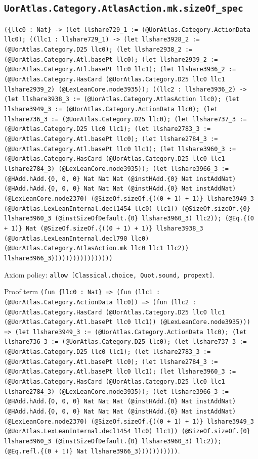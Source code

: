 \documentclass[11pt]{article}
\begin{document}
\subsection*{\texttt{UorAtlas.Category.AtlasAction.mk.sizeOf\_spec}}
\noindent\texttt{(\{llc0 : Nat\} -> (let llshare729\_1 := (@UorAtlas.Category.ActionData llc0); ((llc1 : llshare729\_1) -> (let llshare3928\_2 := (@UorAtlas.Category.D25 llc0); (let llshare2938\_2 := (@UorAtlas.Category.Atl.basePt llc0); (let llshare2939\_2 := (@UorAtlas.Category.Atl.basePt llc0 llc1); (let llshare3936\_2 := (@UorAtlas.Category.HasCard (@UorAtlas.Category.D25 llc0 llc1 llshare2939\_2) (@LexLeanCore.node3935)); ((llc2 : llshare3936\_2) -> (let llshare3938\_3 := (@UorAtlas.Category.AtlasAction llc0); (let llshare3949\_3 := (@UorAtlas.Category.ActionData llc0); (let llshare736\_3 := (@UorAtlas.Category.D25 llc0); (let llshare737\_3 := (@UorAtlas.Category.D25 llc0 llc1); (let llshare2783\_3 := (@UorAtlas.Category.Atl.basePt llc0); (let llshare2784\_3 := (@UorAtlas.Category.Atl.basePt llc0 llc1); (let llshare3960\_3 := (@UorAtlas.Category.HasCard (@UorAtlas.Category.D25 llc0 llc1 llshare2784\_3) (@LexLeanCore.node3935)); (let llshare3966\_3 := (@HAdd.hAdd.\{0, 0, 0\} Nat Nat Nat (@instHAdd.\{0\} Nat instAddNat) (@HAdd.hAdd.\{0, 0, 0\} Nat Nat Nat (@instHAdd.\{0\} Nat instAddNat) (@LexLeanCore.node2370) (@SizeOf.sizeOf.\{((0 + 1) + 1)\} llshare3949\_3 (@UorAtlas.LexLeanInternal.decl1454 llc0) llc1)) (@SizeOf.sizeOf.\{0\} llshare3960\_3 (@instSizeOfDefault.\{0\} llshare3960\_3) llc2)); (@Eq.\{(0 + 1)\} Nat (@SizeOf.sizeOf.\{((0 + 1) + 1)\} llshare3938\_3 (@UorAtlas.LexLeanInternal.decl790 llc0) (@UorAtlas.Category.AtlasAction.mk llc0 llc1 llc2)) llshare3966\_3)))))))))))))))))}\par
\noindent Axiom policy: \texttt{allow [Classical.choice, Quot.sound, propext]}.\par
\noindent Proof term \texttt{(fun \{llc0 : Nat\} => (fun (llc1 : (@UorAtlas.Category.ActionData llc0)) => (fun (llc2 : (@UorAtlas.Category.HasCard (@UorAtlas.Category.D25 llc0 llc1 (@UorAtlas.Category.Atl.basePt llc0 llc1)) (@LexLeanCore.node3935))) => (let llshare3949\_3 := (@UorAtlas.Category.ActionData llc0); (let llshare736\_3 := (@UorAtlas.Category.D25 llc0); (let llshare737\_3 := (@UorAtlas.Category.D25 llc0 llc1); (let llshare2783\_3 := (@UorAtlas.Category.Atl.basePt llc0); (let llshare2784\_3 := (@UorAtlas.Category.Atl.basePt llc0 llc1); (let llshare3960\_3 := (@UorAtlas.Category.HasCard (@UorAtlas.Category.D25 llc0 llc1 llshare2784\_3) (@LexLeanCore.node3935)); (let llshare3966\_3 := (@HAdd.hAdd.\{0, 0, 0\} Nat Nat Nat (@instHAdd.\{0\} Nat instAddNat) (@HAdd.hAdd.\{0, 0, 0\} Nat Nat Nat (@instHAdd.\{0\} Nat instAddNat) (@LexLeanCore.node2370) (@SizeOf.sizeOf.\{((0 + 1) + 1)\} llshare3949\_3 (@UorAtlas.LexLeanInternal.decl1454 llc0) llc1)) (@SizeOf.sizeOf.\{0\} llshare3960\_3 (@instSizeOfDefault.\{0\} llshare3960\_3) llc2)); (@Eq.refl.\{(0 + 1)\} Nat llshare3966\_3)))))))))))}.\par
\end{document}
